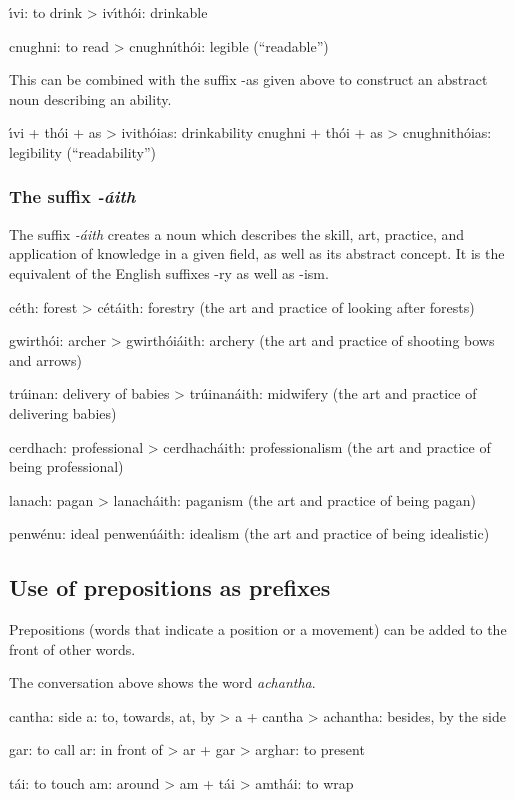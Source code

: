 \'{\i}vi: to drink
> iv\'{\i}th\'{o}i: drinkable

cnughni: to read
> cnughn\'{\i}th\'{o}i: legible (``readable'')

This can be combined with the suffix -as given above to construct an abstract noun describing an ability.

\'{\i}vi + th\'{o}i + as > ivith\'{o}ias: drinkability
cnughni + th\'{o}i + as > cnughnith\'{o}ias: legibility (``readability'')

\subsubsection{The suffix \textit{-\'{a}ith}}

The suffix \textit{-\'{a}ith} creates a noun which describes the skill, art, practice, and application of knowledge in a given field, as well as its abstract concept. It is the equivalent of the English suffixes -ry as well as -ism.

c\'{e}th: forest
> c\'{e}t\'{a}ith: forestry (the art and practice of looking after forests)

gwirth\'{o}i: archer
> gwirth\'{o}i\'{a}ith: archery (the art and practice of shooting bows and arrows)

tr\'{u}inan: delivery of babies
> tr\'{u}inan\'{a}ith: midwifery (the art and practice of delivering babies)

cerdhach: professional
> cerdhach\'{a}ith: professionalism (the art and practice of being professional)

lanach: pagan
> lanach\'{a}ith: paganism (the art and practice of being pagan)

penw\'{e}nu: ideal
penwen\'{u}\'{a}ith: idealism (the art and practice of being idealistic)

\subsection{Use of prepositions as prefixes}

Prepositions (words that indicate a position or a movement) can be added to the front of other words.

The conversation above shows the word \textit{achantha}.

cantha: side
a: to, towards, at, by
> a + cantha > achantha: besides, by the side

gar: to call
ar: in front of
> ar + gar > arghar: to present

t\'{a}i: to touch
am: around
> am + t\'{a}i > amth\'{a}i: to wrap

